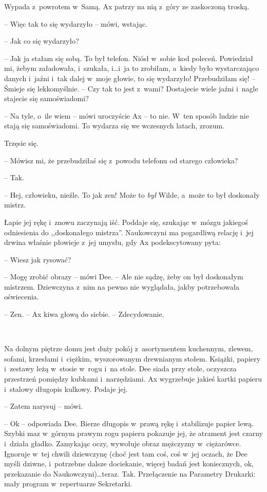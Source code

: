 \documentclass[oneside,polish,11pt,sfheadings]{mwbk}
\begin{document}
Wypada z~powrotem w~Samą. Ax patrzy na nią z~góry ze zaskoczoną troską.

-- Więc tak to się wydarzyło -- mówi, wstając.

-- Jak co się wydarzyło?

-- Jak ja stałam się sobą. To był telefon. Niósł w~sobie kod poleceń.
Powiedział mi, żebym załadowała, i~szukała, i\ldots i~ja to zrobiłam, a~kiedy było wystarczająco danych i~jaźni i~tak dalej w~moje głowie, to
się wydarzyło! Przebudziłam się! -- Śmieje się lekkomyślnie. -- Czy tak to
jest z~wami? Dostajecie wiele jaźni i~nagle stajecie się samoświadomi?

-- Na tyle, o~ile wiem -- mówi uroczyście Ax -- to nie. W~ten sposób ludzie
nie stają się samoświadomi. To wydarza się we wczesnych latach, zrozum.

Trzęsie się. 

-- Mówisz mi, że przebudziłaś się z~powodu telefonu od
starego człowieka?

-- Tak.

-- Hej, człowieku, nieźle. To jak zen! Może to \emph{był} Wilde, a~może
to był doskonały mistrz.

Łapie jej rękę i~znowu zaczynają iść. Poddaje się, szukając w~mózgu
jakiegoś odniesienia do ,,doskonałego mistrza''. Naukowczyni ma pogardliwą
relację i~jej drwina właśnie płowieje z~jej umysłu, gdy Ax
podekscytowany pyta:

-- Wiesz jak rysować?

-- Mogę zrobić obrazy -- mówi Dee. -- Ale nie sądzę, żeby on był doskonałym
mistrzem. Dziewczyna z~nim na pewno nie wyglądała, jakby potrzebowała
oświecenia.

-- Zen. -- Ax kiwa głową do siebie. -- Zdecydowanie.

~

Na dolnym piętrze domu jest duży pokój z~asortymentem kuchennym, zlewem,
sofami, krzesłami i~ciężkim, wyszorowanym drewnianym stołem. Książki,
papiery i~zestawy leżą w~stosie w~rogu i~na stole. Dee siada przy stole,
oczyszcza przestrzeń pomiędzy kubkami i~narzędziami. Ax wygrzebuje
jakieś kartki papieru i~stalowy długopis kulkowy. Podaje jej.

-- Zatem narysuj -- mówi.

-- Ok -- odpowiada Dee. Bierze długopis w~prawą rękę i~stabilizuje papier
lewą. Szybki maz w~górnym prawym rogu papieru pokazuje jej, że atrament
jest czarny i~działa gładko. Zamykając oczy, wywołuje obraz mężczyzny w~ciężarówce. Ignoruje w~tej chwili dziewczynę (choć jest tam coś, coś w~jej oczach, że Dee myśli dziwne, i~potrzebne dalsze dociekanie, więcej
badań jest koniecznych, ok, przekazanie do Naukowczyni)\ldots teraz. Tak.
Przełączenie na Parametry Drukarki: mały program w~repertuarze
Sekretarki.
\end{document}
